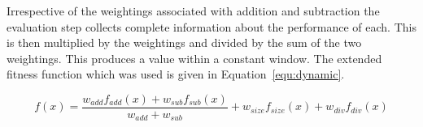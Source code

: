 Irrespective of the weightings associated with addition and subtraction the
evaluation step collects complete information about the performance of each.
This is then multiplied by the weightings and divided by the sum of the two
weightings. This produces a value within a constant window. The extended fitness
function which was used is given in Equation~\ref{equ:dynamic}.

\begin{equation}
	\label{equ:dynamic}
	f(x) = \frac{w_{add} f_{add}(x) + w_{sub} f_{sub}(x)}{w_{add} + w_{sub}} + w_{size} f_{size}(x) +
	w_{div} f_{div}(x)
\end{equation}
